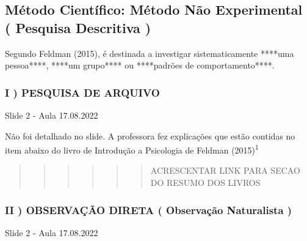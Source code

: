 \documentclass[
]{book}
\begin{document}
\hypertarget{muxe9todo-cientuxedfico-muxe9todo-nuxe3o-experimental-pesquisa-descritiva-1}{%
\subsection{Método Científico: Método Não Experimental ( Pesquisa Descritiva )}\label{muxe9todo-cientuxedfico-muxe9todo-nuxe3o-experimental-pesquisa-descritiva-1}}

Segundo Feldman (2015), é destinada a investigar sistematicamente ****uma pessoa****, ****um grupo**** ou ****padrões de comportamento****.

\hypertarget{i-pesquisa-de-arquivo-1}{%
\subsubsection{I ) PESQUISA DE ARQUIVO}\label{i-pesquisa-de-arquivo-1}}

Slide 2 - Aula 17.08.2022

Não foi detalhado no slide. A professora fez explicações que estão contidas no item abaixo do livro de Introdução a Psicologia de Feldman (2015)\textsuperscript{1}

\begin{quote}
\begin{quote}
\begin{quote}
\begin{quote}
\begin{quote}
\begin{quote}
ACRESCENTAR LINK PARA SECAO DO RESUMO DOS LIVROS
\end{quote}
\end{quote}
\end{quote}
\end{quote}
\end{quote}
\end{quote}

\hypertarget{ii-observauxe7uxe3o-direta-observauxe7uxe3o-naturalista-1}{%
\subsubsection{II ) OBSERVAÇÃO DIRETA ( Observação Naturalista )}\label{ii-observauxe7uxe3o-direta-observauxe7uxe3o-naturalista-1}}

Slide 2 - Aula 17.08.2022
\end{document}
